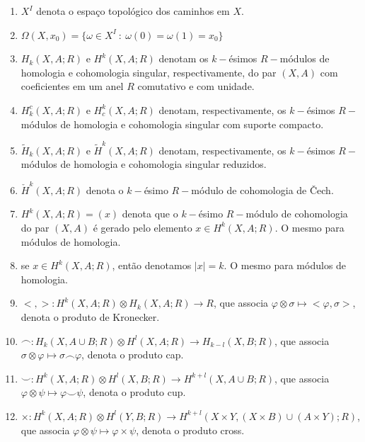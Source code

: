 \documentclass[12pt,oneside]{book} %
\newcommand{\ccup}{\smile}
\newcommand{\ccap}{\frown}
\newcommand{\tensor}{\otimes}
\newcommand{\wt}{\widetilde}
\begin{document}
\begin{enumerate}
	\item $X^{I}$ denota o espaço topológico dos caminhos em $X$.
	\item $\Omega(X,x_{0})=\{ \omega\in X^{I} \ : \ \omega(0)=\omega(1)=x_{0} \}$
	\item $H_{k}(X,A;R)$ e $H^{k}(X,A;R)$ denotam os $k-$ésimos $R-$módulos de homologia e cohomologia singular, respectivamente, do par $(X,A)$ com coeficientes em um anel $R$ comutativo e com unidade.
	\item $H_{k}^{c}(X,A;R)$ e $H^{k}_{c}(X,A;R)$ denotam, respectivamente, os $k-$ésimos $R-$módulos de homologia e cohomologia singular com suporte compacto.
	\item $\wt{H}_{k}(X,A;R)$ e $\wt{H}^{k}(X,A;R)$ denotam, respectivamente, os $k-$ésimos $R-$módulos de homologia e cohomologia singular reduzidos.
	\item $\check{H}^{k}(X,A;R)$ denota o $k-$ésimo $R-$módulo de cohomologia de \v{C}ech.
	\item $H^{k}(X,A;R)=(x)$ denota que o $k-$ésimo $R-$módulo de cohomologia do par $(X,A)$ é gerado pelo elemento $x\in H^{k}(X,A;R)$. O mesmo para módulos de homologia.
	\item se $x\in H^{k}(X,A;R)$, então denotamos $|x|=k$. O mesmo para módulos de homologia.
	\item $<,>:H^{k}(X,A;R)\tensor H_{k}(X,A;R)\to R$, que associa $\varphi\tensor\sigma\mapsto <\varphi,\sigma>$, denota o produto de Kronecker.
	\item $\ccap:H_{k}(X,A\cup B;R)\tensor H^{l}(X,A;R)\to H_{k-l}(X,B;R)$, que associa $\sigma\tensor\varphi\mapsto\sigma\ccap\varphi$, denota o produto cap.
	\item $\ccup:H^{k}(X,A;R)\tensor H^{l}(X,B;R)\to H^{k+l}(X,A\cup B;R)$, que associa $\varphi\tensor\psi\mapsto\varphi\ccup\psi$, denota o produto cup.
	\item $\times:H^{k}(X,A;R)\tensor H^{l}(Y,B;R)\to H^{k+l}(X\times Y,(X\times B)\cup(A\times Y);R)$, que associa $\varphi\tensor\psi\mapsto\varphi\times\psi$, denota o produto cross.
	\thispagestyle{empty}
	
\end{enumerate}





\end{document}
